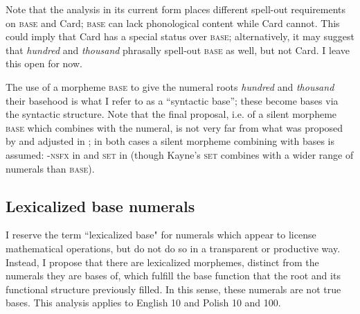\documentclass[output=paper]{langscibook}
\begin{document}

Note that the analysis in its current form places different spell-out requirements on \textsc{base} and Card; \textsc{base} can lack phonological content while Card cannot. This could imply that Card has a special status over \textsc{base}; alternatively, it may suggest that \textit{hundred} and \textit{thousand} phrasally spell-out \textsc{base} as well, but not Card. I leave this open for now.

The use of a morpheme \textsc{base} to give the numeral roots \textit{hundred} and \textit{thousand} their basehood is what I refer to as a ``syntactic base''; these become bases via the syntactic structure. Note that the final proposal, i.e. of a silent morpheme \textsc{base} which combines with the numeral, is not very far from what was proposed by \citet{kayne2005bases} and adjusted in \citet{kayne2019oneTwo}; in both cases a silent morpheme combining with bases is assumed: \textsc{-nsfx} in
 \citet{kayne2005bases} and \textsc{set} in \citet{kayne2019oneTwo} (though Kayne's \textsc{set} combines with a wider range of numerals than \textsc{base}).

\subsection{Lexicalized base numerals}\label{klo:lexicalizedBases}

I reserve the term ``lexicalized base" for numerals which appear to license mathematical operations, but do not do so in a transparent or productive way. Instead, I propose that there are lexicalized morphemes, distinct from the numerals they are bases of, which fulfill the base function that the root and its functional structure previously filled. In this sense, these numerals are not true bases. This analysis applies to English 10 and Polish 10 and 100. 
\end{document}
